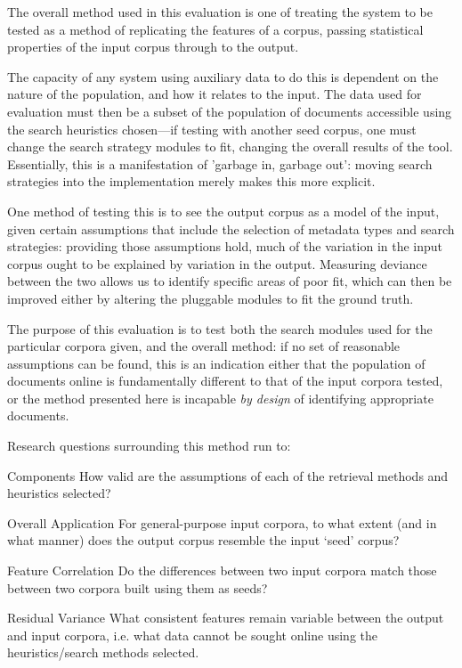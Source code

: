

The overall method used in this evaluation is one of treating the system to be tested as a method of replicating the features of a corpus, passing statistical properties of the input corpus through to the output.

The capacity of any system using auxiliary data to do this is dependent on the nature of the population, and how it relates to the input.  The data used for evaluation must then be a subset of the population of documents accessible using the search heuristics chosen---if testing with another seed corpus, one must change the search strategy modules to fit, changing the overall results of the tool.  Essentially, this is a manifestation of 'garbage in, garbage out': moving search strategies into the implementation merely makes this more explicit.

One method of testing this is to see the output corpus as a model of the input, given certain assumptions that include the selection of metadata types and search strategies: providing those assumptions hold, much of the variation in the input corpus ought to be explained by variation in the output.  Measuring deviance between the two allows us to identify specific areas of poor fit, which can then be improved either by altering the pluggable modules to fit the ground truth.

The purpose of this evaluation is to test both the search modules used for the particular corpora given, and the overall method: if no set of reasonable assumptions can be found, this is an indication either that the population of documents online is fundamentally different to that of the input corpora tested, or the method presented here is incapable \textsl{by design} of identifying appropriate documents.


Research questions surrounding this method run to:

\begin{itemizeTitle}

    \item[Components] How valid are the assumptions of each of the retrieval methods and heuristics selected?

    \item[Overall Application] For general-purpose input corpora, to what extent (and in what manner) does the output corpus resemble the input `seed' corpus?

    \item[Feature Correlation] Do the differences between two input corpora match those between two corpora built using them as seeds?

    \item[Residual Variance] What consistent features remain variable between the output and input corpora, i.e. what data cannot be sought online using the heuristics/search methods selected.

\end{itemizeTitle}

